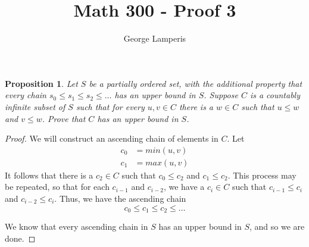 \documentclass[12pt]{article}
\title{Math 300 - Proof 3}
\author{George Lamperis}
\date{}
\theoremstyle{mystyle}
\newtheorem{prop}[thm]{Proposition}
\begin{document}
\maketitle

\begin{prop}
  Let $S$ be a partially ordered set, with the additional property that every
  chain $s_0 \leq s_1 \leq s_2 \leq \ldots$ has an upper bound in $S$. Suppose
  $C$ is a countably infinite subset of $S$ such that for every $u,v \in C$
  there is a $w \in C$ such that $u \leq w$ and $v \leq w$. Prove that $C$ has 
  an upper bound in $S$.
\end{prop}
\begin{proof}
  We will construct an ascending chain of elements in $C$. Let
  \begin{align*}
    c_0 &= min(u,v) \\
    c_1 &= max(u,v)
  \end{align*}
  It follows that there is a $c_2 \in C$ such that $c_0 \leq c_2$ and 
  $c_1 \leq c_2$. This process may be repeated, so that for each $c_{i-1}$
  and $c_{i-2}$, we have a $c_i \in C$ such that $c_{i-1} \leq c_i$ and
  $c_{i-2} \leq c_i$. Thus, we have the ascending chain
  $$ c_0 \leq c_1 \leq c_2 \leq \ldots$$
  
  We know that every ascending chain in $S$ has an upper bound in $S$, and so we
  are done.
\end{proof}
\end{document}
